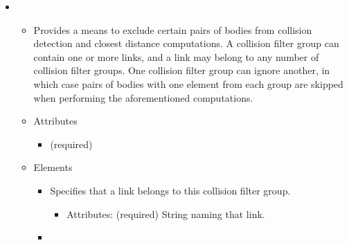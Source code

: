 \begin{itemize}
  \item {}
    \begin{itemize}
      \item Provides a means to exclude certain pairs of bodies from collision
        detection and closest distance computations. A collision filter group
        can contain one or more links, and a link may belong to any number of
        collision filter groups. One collision filter group can ignore another,
        in which case pairs of bodies with one element from each group are
        skipped when performing the aforementioned computations.
      \item Attributes
        \begin{itemize}
          \item {} (required)
        \end{itemize}
      \item Elements
        \begin{itemize}
          \item {} 

            Specifies that a link belongs to this collision filter group.
            \begin{itemize}
              \item Attributes:  (required) String naming that link. 
            \end{itemize}

          \item {}


\end{itemize}
\end{itemize}
\end{itemize}
